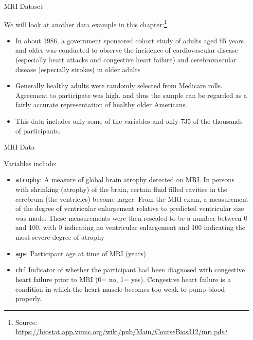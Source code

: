 \documentclass[10pt,t]{beamer}
\begin{document}
\begin{frame}{MRI Dataset}
	
	We will look at another data example in this chapter:\footnote{Source: \url{https://biostat.app.vumc.org/wiki/pub/Main/CourseBios312/mri.pd}}
	\smallskip
	
	
	\begin{itemize}
	 \item In about 1986, a government sponsored cohort study of adults aged 65 years and older was conducted to observe the incidence of cardiovascular disease (especially heart attacks and congestive heart failure) and cerebrovascular disease (especially strokes) in older adults
	\medskip
	
	\item Generally healthy adults were randomly selected from Medicare rolls. Agreement to participate was high, and thus the sample can be regarded as a fairly accurate representation of healthy older Americans. 
	\medskip
	
	\item  This data includes only some of the variables and only 735 of the thousands of participants.
	
\end{itemize}


\end{frame}

\begin{frame}{MRI Data}
	
	
	Variables include:
	\smallskip	
	
	\begin{itemize}
		\item \texttt{atrophy}: A measure of global brain atrophy detected on MRI. In persons with shrinking (atrophy) of the brain, certain fluid filled cavities in the cerebrum (the ventricles) become larger. From the MRI exam, a measurement of the degree of ventricular enlargement relative to predicted ventricular size was made. These measurements were then rescaled to be a number between 0 and 100, with 0 indicating no ventricular enlargement and 100 indicating the most severe degree of atrophy
		\medskip
		
		\item \texttt{age}: Participant age at time of MRI (years)
		\medskip
		
		\item \texttt{chf} Indicator of whether the participant had been diagnosed with congestive heart failure prior to MRI (0= no, 1= yes). Congestive heart failure is a condition in which the heart muscle becomes too weak to pump blood properly.
	\end{itemize}
	


	
\end{frame}
\end{document}
